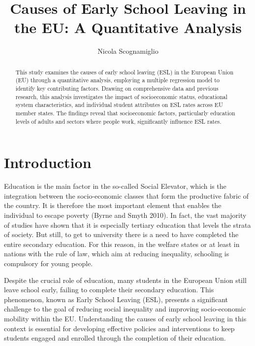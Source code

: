 \documentclass[
  letterpaper,
  DIV=11,
  numbers=noendperiod,
  abstract]{scrartcl}
\title{Causes of Early School Leaving in the EU: A Quantitative
Analysis}
\author{Nicola Scognamiglio}
\date{}
\renewcommand*\contentsname{Table of contents}
\newcommand\contentsname{Table of contents}
\begin{document}
\maketitle
\begin{abstract}
This study examines the causes of early school leaving (ESL) in the
European Union (EU) through a quantitative analysis, employing a
multiple regression model to identify key contributing factors. Drawing
on comprehensive data and previous research, this analysis investigates
the impact of socioeconomic status, educational system characteristics,
and individual student attributes on ESL rates across EU member states.
The findings reveal that socioeconomic factors, particularly education
levels of adults and sectors where people work, significantly influence
ESL rates.
\end{abstract}

\renewcommand*\contentsname{Contents}
{
\hypersetup{linkcolor=}
\setcounter{tocdepth}{2}
\tableofcontents
}
\section{Introduction}\label{introduction}

Education is the main factor in the so-called Social Elevator, which is
the integration between the socio-economic classes that form the
productive fabric of the country. It is therefore the most important
element that enables the individual to escape poverty (Byrne and Smyth
2010). In fact, the vast majority of studies have shown that it is
especially tertiary education that levels the strata of society. But
still, to get to university there is a need to have completed the entire
secondary education. For this reason, in the welfare states or at least
in nations with the rule of law, which aim at reducing inequality,
schooling is compulsory for young people.

Despite the crucial role of education, many students in the European
Union still leave school early, failing to complete their secondary
education. This phenomenon, known as Early School Leaving (ESL),
presents a significant challenge to the goal of reducing social
inequality and improving socio-economic mobility within the EU.
Understanding the causes of early school leaving in this context is
essential for developing effective policies and interventions to keep
students engaged and enrolled through the completion of their education.
\end{document}
